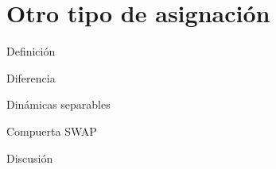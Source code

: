 \section{Otro tipo de asignación}

\begin{frame}{Definición}
    \lipsum[1]
\end{frame}

\begin{frame}{Diferencia}
    \lipsum[1]
\end{frame}

\begin{frame}{Dinámicas separables}
    \lipsum[1]
\end{frame}

\begin{frame}{Compuerta SWAP}
    \lipsum[1]
\end{frame}

\begin{frame}{Discusión}
    \lipsum[1]
\end{frame}